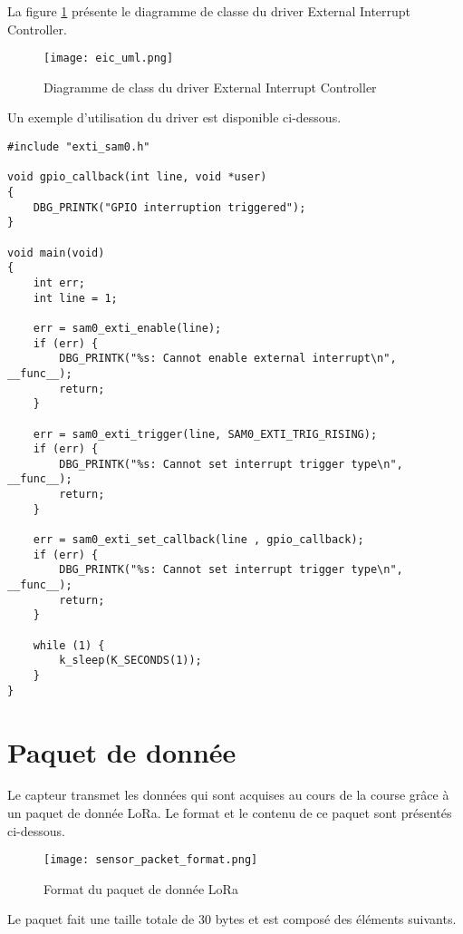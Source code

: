 La figure \ref{fig:driver_eic_uml} présente le diagramme de classe du driver External Interrupt Controller.

\begin{figure}[htb]
\centering 
\texttt{[image: eic\_uml.png]} 
\caption{Diagramme de class du driver External Interrupt Controller}
\label{fig:driver_eic_uml}
\end{figure}

Un exemple d'utilisation du driver est disponible ci-dessous.

\begin{lstlisting}[style=CStyle]
#include "exti_sam0.h"

void gpio_callback(int line, void *user)
{
	DBG_PRINTK("GPIO interruption triggered");
}

void main(void)
{
	int err;
	int line = 1;

	err = sam0_exti_enable(line);
	if (err) {
		DBG_PRINTK("%s: Cannot enable external interrupt\n", __func__);
		return;	
	}
	
	err = sam0_exti_trigger(line, SAM0_EXTI_TRIG_RISING);
	if (err) {
		DBG_PRINTK("%s: Cannot set interrupt trigger type\n", __func__);
		return;	
	}

	err = sam0_exti_set_callback(line , gpio_callback);
	if (err) {
		DBG_PRINTK("%s: Cannot set interrupt trigger type\n", __func__);
		return;	
	}	

	while (1) {
		k_sleep(K_SECONDS(1));	
	}
}
\end{lstlisting}


\section{Paquet de donnée}

Le capteur transmet les données qui sont acquises au cours de la course grâce à un paquet de donnée LoRa. Le format et le contenu de ce paquet sont présentés ci-dessous.

\begin{figure}[htb]
\centering 
\texttt{[image: sensor\_packet\_format.png]} 
\caption{Format du paquet de donnée LoRa}
\label{fig:sensor_packet_format}
\end{figure}

Le paquet fait une taille totale de 30 bytes et est composé des éléments suivants.

